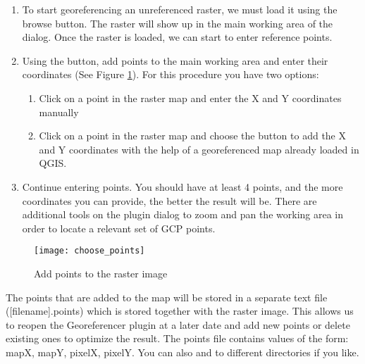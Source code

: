 \label{georeferencer_entering}

\begin{enumerate}
\item To start georeferencing an unreferenced raster, we must load it using the \browsebutton browse button. The raster will show up in the main working area of the dialog. Once the raster is loaded, we can start to enter reference points.

\item Using the  button, add points to the main working area and enter their coordinates (See Figure \ref{fig:choose_points}). For this procedure you have two options:

\begin{enumerate}
\item Click on a point in the raster map and enter the X and Y coordinates manually
\item Click on a point in the raster map and choose the button  to add the X and Y coordinates with the help of a georeferenced map already loaded in QGIS.
\end{enumerate}
\item Continue entering points. You should have at least 4 points, and the more coordinates you can provide, the better the result will be. There are additional tools on the plugin dialog to zoom and pan the working area in order to locate a relevant set of GCP points.
\end{enumerate}

\begin{figure}[ht]
\begin{center}
  \caption{Add points to the raster image \nixcaption}\label{fig:choose_points}\smallskip
  \texttt{[image: choose\_points]}
\end{center}
\end{figure}

The points that are added to the map will be stored in a separate text file ([filename].points) which is stored together with the raster image. This allows us to reopen the Georeferencer plugin at a later date and add new points or delete existing ones to optimize the result. The points file contains values of the form: mapX, mapY, pixelX, pixelY. You can also  and  to different directories if you like.

\label{georeferencer_transformation}


